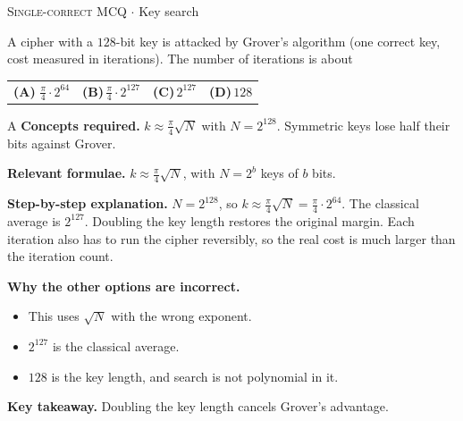 \documentclass[11pt,a4paper]{article}
\newcommand{\optlabel}[1]{\textbf{(#1)}}
\newcommand{\correctlabel}[1]{\textcolor{okgreen}{\textbf{(#1)}\,\ding{51}}}
\newenvironment{qitem}[1]{\begin{list}{}{\setlength{\leftmargin}{3.3em}\setlength{\labelwidth}{3.1em}%
  \setlength{\labelsep}{0.2em}\setlength{\topsep}{3pt}\setlength{\parsep}{3pt}}\item[\textbf{Q.#1}\hfill]}{\end{list}}
\newcommand{\qsep}{\par\vspace{2pt}{\color{black!15}\hrule}\vspace{4pt}}
\newcommand{\qmeta}[2]{{\footnotesize\color{black!60}\textsc{#1} \;$\cdot$\; #2}\par}
\begin{document}
\begin{qitem}{68}
\qmeta{Single-correct MCQ}{Key search}
A cipher with a $128$-bit key is attacked by Grover's algorithm (one correct key, cost measured in iterations). The number of iterations is about
\par\smallskip\noindent\begin{tabularx}{\linewidth}{@{}*{4}{L}@{}}
\correctlabel{A}\,$\frac\pi4\cdot2^{64}$ & \optlabel{B}\,$\frac\pi4\cdot2^{127}$ & \optlabel{C}\,$2^{127}$ & \optlabel{D}\,$128$
\end{tabularx}
\end{qitem}
\begin{solbox}{A}
\textbf{\color{brand}Concepts required.} $k \approx \frac\pi4\sqrt N$ with $N = 2^{128}$. Symmetric keys lose half their bits against Grover.

\textbf{\color{brand}Relevant formulae.} $k \approx \frac\pi4\sqrt N$, with $N = 2^{b}$ keys of $b$ bits.

\textbf{\color{brand}Step-by-step explanation.} $N = 2^{128}$, so $k \approx \frac\pi4\sqrt N = \frac\pi4\cdot 2^{64}$. The classical average is $2^{127}$. Doubling the key length restores the original margin.
Each iteration also has to run the cipher reversibly, so the real cost is much larger than the iteration count.

\textbf{\color{brand}Why the other options are incorrect.}
\begin{itemize}[leftmargin=2.4em, itemsep=1pt, topsep=2pt]
\item[\textbf{(B)}] This uses $\sqrt N$ with the wrong exponent.
\item[\textbf{(C)}] $2^{127}$ is the classical average.
\item[\textbf{(D)}] $128$ is the key length, and search is not polynomial in it.
\end{itemize}
\textbf{\color{brand}Key takeaway.} Doubling the key length cancels Grover's advantage.
\end{solbox}
\qsep
\end{document}
